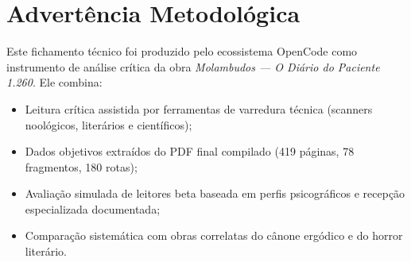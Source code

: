 \documentclass[14pt,openany]{extbook}
\begin{document}
\hypersetup{pageanchor=false}

\begin{titlepage}
\thispagestyle{empty}
\null\vfill
\end{titlepage}

\frontmatter
\chapter*{Advertência Metodológica}

Este fichamento técnico foi produzido pelo ecossistema OpenCode como instrumento de análise crítica da obra \textit{Molambudos --- O Diário do Paciente 1.260}. Ele combina:

\begin{itemize}
\item Leitura crítica assistida por ferramentas de varredura técnica (scanners noológicos, literários e científicos);
\item Dados objetivos extraídos do PDF final compilado (419 páginas, 78 fragmentos, 180 rotas);
\item Avaliação simulada de leitores beta baseada em perfis psicográficos e recepção especializada documentada;
\item Comparação sistemática com obras correlatas do cânone ergódico e do horror literário.
\end{itemize}
\end{document}
